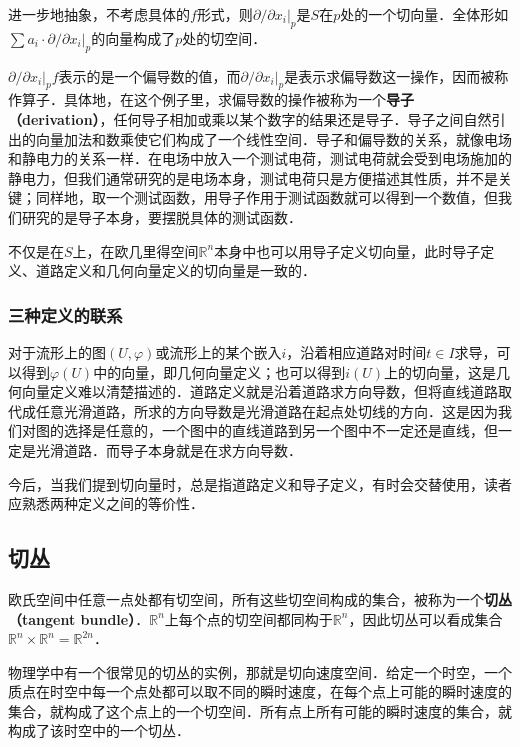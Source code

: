 进一步地抽象，不考虑具体的$f$形式，则$\partial/\partial x_i|_{p}$是$S$在$p$处的一个切向量．全体形如$\sum a_i\cdot\partial/\partial x_i|_{p}$的向量构成了$p$处的切空间．

$\partial/\partial x_i|_{p}f$表示的是一个偏导数的值，而$\partial/\partial x_i|_{p}$是表示求偏导数这一操作，因而被称作算子．具体地，在这个例子里，求偏导数的操作被称为一个\textbf{导子（derivation）}，任何导子相加或乘以某个数字的结果还是导子．导子之间自然引出的向量加法和数乘使它们构成了一个线性空间．导子和偏导数的关系，就像电场和静电力的关系一样．在电场中放入一个测试电荷，测试电荷就会受到电场施加的静电力，但我们通常研究的是电场本身，测试电荷只是方便描述其性质，并不是关键；同样地，取一个测试函数，用导子作用于测试函数就可以得到一个数值，但我们研究的是导子本身，要摆脱具体的测试函数．

不仅是在$S$上，在欧几里得空间$\mathbb{R}^n$本身中也可以用导子定义切向量，此时导子定义、道路定义和几何向量定义的切向量是一致的．

\subsubsection{三种定义的联系}

对于流形上的图$(U,\varphi)$或流形上的某个嵌入$i$，沿着相应道路对时间$t\in I$求导，可以得到$\varphi(U)$中的向量，即几何向量定义；也可以得到$i(U)$上的切向量，这是几何向量定义难以清楚描述的．道路定义就是沿着道路求方向导数，但将直线道路取代成任意光滑道路，所求的方向导数是光滑道路在起点处切线的方向．这是因为我们对图的选择是任意的，一个图中的直线道路到另一个图中不一定还是直线，但一定是光滑道路．而导子本身就是在求方向导数．

今后，当我们提到切向量时，总是指道路定义和导子定义，有时会交替使用，读者应熟悉两种定义之间的等价性．

\subsection{切丛}

欧氏空间中任意一点处都有切空间，所有这些切空间构成的集合，被称为一个\textbf{切丛（tangent bundle）}．$\mathbb{R}^n$上每个点的切空间都同构于$\mathbb{R}^n$，因此切丛可以看成集合$\mathbb{R}^n\times\mathbb{R}^n=\mathbb{R}^{2n}$．

物理学中有一个很常见的切丛的实例，那就是切向速度空间．给定一个时空，一个质点在时空中每一个点处都可以取不同的瞬时速度，在每个点上可能的瞬时速度的集合，就构成了这个点上的一个切空间．所有点上所有可能的瞬时速度的集合，就构成了该时空中的一个切丛．









